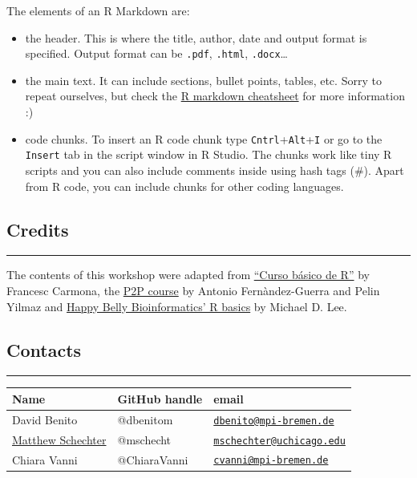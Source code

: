 \documentclass[
]{article}
\providecommand{\tightlist}{%
  \setlength{\itemsep}{0pt}\setlength{\parskip}{0pt}}
\begin{document}
The elements of an R Markdown are:

\begin{itemize}
\tightlist
\item
  the header. This is where the title, author, date and output format is
  specified. Output format can be \texttt{.pdf}, \texttt{.html},
  \texttt{.docx}\ldots{}
\item
  the main text. It can include sections, bullet points, tables, etc.
  Sorry to repeat ourselves, but check the
  \href{https://www.rstudio.com/resources/cheatsheets/}{R markdown
  cheatsheet} for more information :)
\item
  code chunks. To insert an R code chunk type
  \texttt{Cntrl}+\texttt{Alt}+\texttt{I} or go to the \texttt{Insert}
  tab in the script window in R Studio. The chunks work like tiny R
  scripts and you can also include comments inside using hash tags (\#).
  Apart from R code, you can include chunks for other coding languages.
\end{itemize}

\hypertarget{credits}{%
\subsection{Credits}\label{credits}}

\begin{center}\rule{0.5\linewidth}{\linethickness}\end{center}

The contents of this workshop were adapted from
\href{http://www.ub.edu/stat/docencia/EADB/Curso\%20basico\%20de\%20R.pdf}{``Curso
básico de R''} by Francesc Carmona, the
\href{https://rawgit.com/genomewalker/p2p/master/friday/P2P_r_crash_course.html\#32_ggplot2}{P2P
course} by Antonio Fernàndez-Guerra and Pelin Yilmaz and
\href{https://astrobiomike.github.io/R/basics}{Happy Belly
Bioinformatics' R basics} by Michael D. Lee.

\hypertarget{contacts}{%
\subsection{Contacts}\label{contacts}}

\begin{center}\rule{0.5\linewidth}{\linethickness}\end{center}

\begin{longtable}[]{@{}lll@{}}
\toprule
Name & GitHub handle & email\tabularnewline
\midrule
\endhead
David Benito & @dbenitom &
\href{mailto:dbenito@mpi-bremen.de}{\nolinkurl{dbenito@mpi-bremen.de}}\tabularnewline
\href{https://orcid.org/0000-0002-8435-3203}{Matthew Schechter} &
@mschecht &
\href{mailto:mschechter@uchicago.edu}{\nolinkurl{mschechter@uchicago.edu}}\tabularnewline
Chiara Vanni & @ChiaraVanni &
\href{mailto:cvanni@mpi-bremen.de}{\nolinkurl{cvanni@mpi-bremen.de}}\tabularnewline
\bottomrule
\end{longtable}
\end{document}
